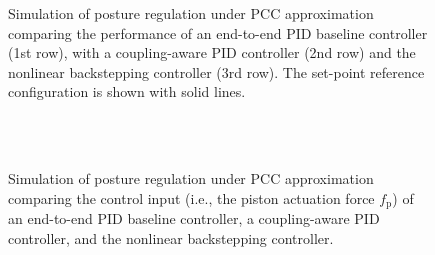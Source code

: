 \begin{figure}[ht]
  \caption{Simulation of posture regulation under \gls{PCC} approximation comparing the performance of an end-to-end PID baseline controller (1st row), with a coupling-aware PID controller (2nd row) and the nonlinear backstepping controller (3rd row). The set-point reference configuration is shown with solid lines.}
  \label{fig:backstepping:time_series_plots}
\end{figure}
\begin{figure}[ht]
  \centering
  \\
  \\
  \caption{Simulation of posture regulation under \gls{PCC} approximation comparing the control input (i.e., the piston actuation force $f_\mathrm{p}$) of an end-to-end PID baseline controller, a coupling-aware PID controller, and the nonlinear backstepping controller.}
  \label{fig:backstepping:time_series_plots_actuation_force}
\end{figure}

